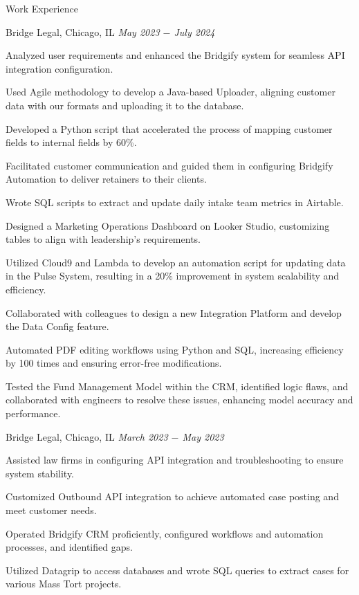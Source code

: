 \documentclass{resume}
\begin{document}
\begin{rSection}{Work Experience}

\begin{rSubsection}{Bridge Legal, Chicago, IL} {\textit{May 2023 $-$ July 2024}}
{}

    \item Analyzed user requirements and enhanced the Bridgify system for seamless API integration configuration.
    \item Used Agile methodology to develop a Java-based Uploader, aligning customer data with our formats and uploading it to the database.
    \item Developed a Python script that accelerated the process of mapping customer fields to internal fields by 60\%.
    \item Facilitated customer communication and guided them in configuring Bridgify Automation to deliver retainers to their clients.
    \item Wrote SQL scripts to extract and update daily intake team metrics in Airtable.
    \item Designed a Marketing Operations Dashboard on Looker Studio, customizing tables to align with leadership's requirements.
    \item Utilized Cloud9 and Lambda to develop an automation script for updating data in the Pulse System, resulting in a 20\% improvement in system scalability and efficiency.
    \item Collaborated with colleagues to design a new Integration Platform and develop the Data Config feature.
    \item Automated PDF editing workflows using Python and SQL, increasing efficiency by 100 times and ensuring error-free modifications.
    \item Tested the Fund Management Model within the CRM, identified logic flaws, and collaborated with engineers to resolve these issues, enhancing model accuracy and performance.

\end{rSubsection}

\begin{rSubsection}{Bridge Legal, Chicago, IL} {\textit{March 2023 $-$ May 2023}}
{}

    \item Assisted law firms in configuring API integration and troubleshooting to ensure system stability.
    \item Customized Outbound API integration to achieve automated case posting and meet customer needs.
    \item Operated Bridgify CRM proficiently, configured workflows and automation processes, and identified gaps.
    \item Utilized Datagrip to access databases and wrote SQL queries to extract cases for various Mass Tort projects.


\end{rSubsection}
\end{rSection}
\end{document}

